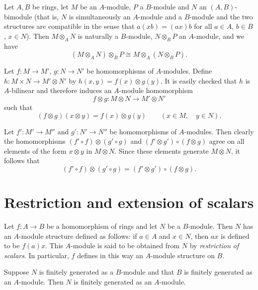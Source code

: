 \begin{exercise}\label{ex:bimodule-tensor}
Let $A, B$ be rings, let $M$ be an $A$-module, $P$ a $B$-module and $N$ an $(A, B)$-bimodule (that is, $N$ is simultaneously an $A$-module and a $B$-module and the two structures are compatible in the sense that $a(xb) = (ax)b$ for all $a \in A$, $b \in B$, $x \in N$). Then $M \otimes_A N$ is naturally a $B$-module, $N \otimes_B P$ an $A$-module, and we have
\[
    (M \otimes_A N) \otimes_B P \cong M \otimes_A (N \otimes_B P).
\]
\end{exercise}

Let $f \colon M \to M'$, $g \colon N \to N'$ be homomorphisms of $A$-modules. Define $h \colon M \times N \to M' \otimes N'$ by $h(x, y) = f(x) \otimes g(y)$. It is easily checked that $h$ is $A$-bilinear and therefore induces an $A$-module homomorphism
\[
    f \otimes g \colon M \otimes N \to M' \otimes N'
\]
such that
\[
    (f \otimes g)(x \otimes y) = f(x) \otimes g(y) \qquad (x \in M, \quad y \in N).
\]

Let $f' \colon M' \to M''$ and $g' \colon N' \to N''$ be homomorphisms of $A$-modules. Then clearly the homomorphisms $(f' \circ f) \otimes (g' \circ g)$ and $(f' \otimes g') \circ (f \otimes g)$ agree on all elements of the form $x \otimes y$ in $M \otimes N$. Since these elements generate $M \otimes N$, it follows that
\[
    (f' \circ f) \otimes (g' \circ g) = (f' \otimes g') \circ (f \otimes g).
\]

\section*{Restriction and extension of scalars}

Let $f \colon A \to B$ be a homomorphism of rings and let $N$ be a $B$-module. Then $N$ has an $A$-module structure defined as follows: if $a \in A$ and $x \in N$, then $ax$ is defined to be $f(a)x$. This $A$-module is said to be obtained from $N$ by \emph{restriction of scalars}. In particular, $f$ defines in this way an $A$-module structure on $B$.

\begin{proposition}\label{prop:finitely-generated-restriction}
Suppose $N$ is finitely generated as a $B$-module and that $B$ is finitely generated as an $A$-module. Then $N$ is finitely generated as an $A$-module.
\end{proposition}

